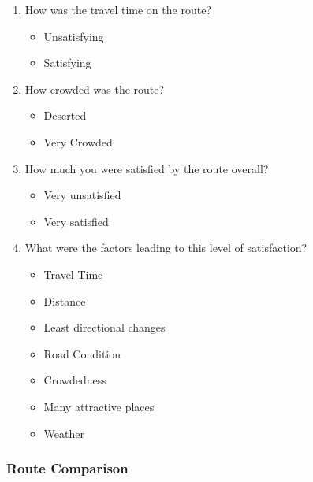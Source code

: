 \begin{enumerate}
    \setcounter{enumi}{\value{surveyCounter}}
    
    \item How was the travel time on the route? 
    \begin{itemize}
        \item Unsatisfying
        \item Satisfying
    \end{itemize}
    
    \item How crowded was the route?
    \begin{itemize}
        \item Deserted
        \item Very Crowded
    \end{itemize}
    
    \item How much you were satisfied by the route overall? 
    \begin{itemize}
        \item Very unsatisfied
        \item Very satisfied
    \end{itemize}
    
    \item What were the factors leading to this level of satisfaction?
    \begin{itemize}
        \item Travel Time
        \item Distance
        \item Least directional changes
        \item Road Condition
        \item Crowdedness
        \item Many attractive places
        \item Weather
    \end{itemize}
    
    
    \setcounter{surveyCounter}{\value{enumi}}
\end{enumerate}

\subsubsection{Route Comparison}

